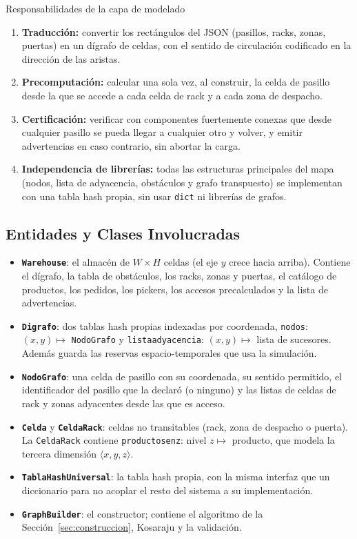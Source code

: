 \documentclass[11pt,a4paper]{article}
\theoremstyle{definition}
\begin{document}
\begin{caja}{Responsabilidades de la capa de modelado}
\begin{enumerate}[leftmargin=*]
\item \textbf{Traducción:} convertir los rectángulos del JSON (pasillos, racks, zonas, puertas) en un dígrafo de celdas, con el sentido de circulación codificado en la dirección de las aristas.
\item \textbf{Precomputación:} calcular una sola vez, al construir, la celda de pasillo desde la que se accede a cada celda de rack y a cada zona de despacho.
\item \textbf{Certificación:} verificar con componentes fuertemente conexas que desde cualquier pasillo se pueda llegar a cualquier otro y volver, y emitir advertencias en caso contrario, sin abortar la carga.
\item \textbf{Independencia de librerías:} todas las estructuras principales del mapa (nodos, lista de adyacencia, obstáculos y grafo transpuesto) se implementan con una tabla hash propia, sin usar \texttt{dict} ni librerías de grafos.
\end{enumerate}
\end{caja}

\subsection{Entidades y Clases Involucradas}

\begin{itemize}[leftmargin=*]
\item \textbf{\texttt{Warehouse}}: el almacén de $W\times H$ celdas (el eje $y$ crece hacia arriba). Contiene el dígrafo, la tabla de obstáculos, los racks, zonas y puertas, el catálogo de productos, los pedidos, los pickers, los accesos precalculados y la lista de advertencias.
\item \textbf{\texttt{Digrafo}}: dos tablas hash propias indexadas por coordenada, \texttt{nodos}: $(x,y)\mapsto$ \texttt{NodoGrafo} y \texttt{lista{}adyacencia}: $(x,y)\mapsto$ lista de sucesores. Además guarda las reservas espacio-temporales que usa la simulación.
\item \textbf{\texttt{NodoGrafo}}: una celda de pasillo con su coordenada, su sentido permitido, el identificador del pasillo que la declaró (o ninguno) y las listas de celdas de rack y zonas adyacentes desde las que es acceso.
\item \textbf{\texttt{Celda}} y \textbf{\texttt{CeldaRack}}: celdas no transitables (rack, zona de despacho o puerta). La \texttt{CeldaRack} contiene \texttt{productos{}en{}z}: nivel $z\mapsto$ producto, que modela la tercera dimensión $\langle x,y,z\rangle$.
\item \textbf{\texttt{TablaHashUniversal}}: la tabla hash propia, con la misma interfaz que un diccionario para no acoplar el resto del sistema a su implementación.
\item \textbf{\texttt{GraphBuilder}}: el constructor; contiene el algoritmo de la Sección~\ref{sec:construccion}, Kosaraju y la validación.
\end{itemize}
\end{document}

